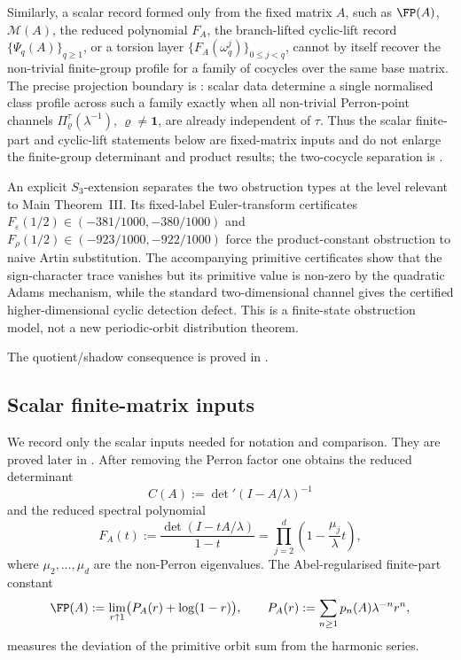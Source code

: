 Similarly, a scalar record formed only from the fixed matrix \(A\), such
as \(\FP(A)\), \(\mathcal M(A)\), the reduced polynomial \(F_A\), the
branch-lifted cyclic-lift record \(\{\Psi_q(A)\}_{q\ge1}\), or a torsion
layer \(\{F_A(\omega_q^j)\}_{0\le j<q}\), cannot by itself recover the
non-trivial finite-group profile for a family of cocycles over the same
base matrix. The precise projection boundary is
: scalar data determine
a single normalised class profile across such a family exactly when all
non-trivial Perron-point channels
\(\Pi_\varrho^\tau(\lambda^{-1})\), \(\varrho\neq\mathbf1\), are already
independent of \(\tau\). Thus the scalar finite-part and cyclic-lift
statements below are fixed-matrix inputs and do not enlarge the
finite-group determinant and product results; the two-cocycle separation is
.

An explicit \(S_3\)-extension separates the two obstruction types at the
level relevant to Main Theorem~III.  Its fixed-label Euler-transform
certificates
\(F_\varepsilon(1/2)\in(-381/1000,-380/1000)\) and
\(F_\rho(1/2)\in(-923/1000,-922/1000)\) force the product-constant
obstruction to naive Artin substitution.  The accompanying primitive
certificates show that the sign-character trace vanishes but its primitive
value is non-zero by the quadratic Adams mechanism, while the standard
two-dimensional channel gives the certified higher-dimensional cyclic
detection defect. This is a finite-state obstruction model, not a new
periodic-orbit distribution theorem.

The quotient/shadow consequence is proved in
.

\subsection{Scalar finite-matrix inputs}

We record only the scalar inputs needed for notation and comparison.
They are proved later in . After removing the
Perron factor one obtains the reduced determinant
\[
  C(A):=\det\nolimits'(I-A/\lambda)^{-1}
\]
and the reduced spectral polynomial
\[
  F_A(t):=\frac{\det(I-tA/\lambda)}{1-t}
  =\prod_{j=2}^d\left(1-\frac{\mu_j}{\lambda}t\right),
\]
where \(\mu_2,\dots,\mu_d\) are the non-Perron eigenvalues. The
Abel-regularised finite-part constant
\[
  \FP(A):=\lim_{r\uparrow 1}\bigl(P_A(r)+\log(1-r)\bigr),
  \qquad
  P_A(r):=\sum_{n\ge 1}p_n(A)\lambda^{-n}r^n,
\]
measures the deviation of the primitive orbit sum from the harmonic
series.

